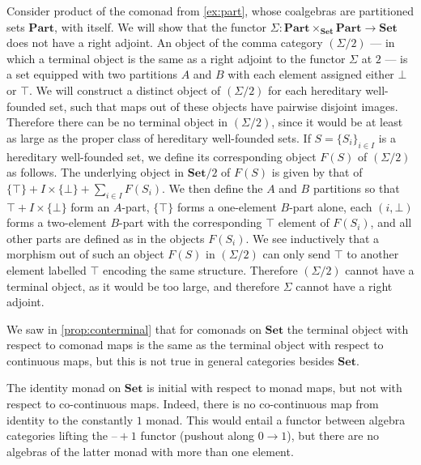 \documentclass[11pt, oneside, article]{memoir}
\theoremstyle{plain}
\theoremstyle{definition}
\theoremstyle{remark}
\newenvironment{counterexample}
{\renewcommand\qedsymbol{$\lrcorner$}%
  \pushQED{\qed}\mycounterexample}
{\popQED\endmycounterexample}
\newcommand{\dash}{{\mathord{\text{--}}}}
\newcommand{\namedcat}[1]{\mathbf{#1}}
\newcommand{\Set}{\namedcat{Set}}
\newcommand{\Part}{\namedcat{Part}}
\newcommand{\carr}{\Sigma}
\newcommand{\setof}[1]{\{#1\}}
\begin{document}
\begin{counterexample}[Non-limit of comonads]\label{ex:nolimit}
  Consider product of the comonad from \cref{ex:part}, whose
  coalgebras are partitioned sets $\Part$, with itself. We will show
  that the functor $\carr \colon \Part \times_\Set \Part \to \Set$
  does not have a right adjoint. An object of the comma category
  $(\carr / 2)$ --- in which a terminal object is the same as a right
  adjoint to the functor $\carr$ at $2$ --- is a set equipped with two
  partitions $A$ and $B$ with each element assigned either $\bot$ or
  $\top$. We will construct a distinct object of $(\carr / 2)$ for
  each hereditary well-founded set, such that maps out of these
  objects have pairwise disjoint images. Therefore there can be no
  terminal object in $(\carr / 2)$, since it would be at least as
  large as the proper class of hereditary well-founded sets. If
  $S = \setof{S_i}_{i \in I}$ is a hereditary well-founded set, we
  define its corresponding object $F(S)$ of $(\carr / 2)$ as
  follows. The underlying object in $\Set/2$ of $F(S)$ is given by
  that of
  $\setof{\top} + I \times \setof{\bot} + \sum_{i \in I} F(S_i)$. We
  then define the $A$ and $B$ partitions so that
  ${\top} + I \times \setof{\bot}$ form an $A$-part, $\setof{\top}$
  forms a one-element $B$-part alone, each $(i, \bot)$ forms a
  two-element $B$-part with the corresponding $\top$ element of
  $F(S_i)$, and all other parts are defined as in the objects
  $F(S_i)$. We see inductively that a morphism out of such an object
  $F(S)$ in $(\carr / 2)$ can only send $\top$ to another element
  labelled $\top$ encoding the same structure. Therefore $(\carr / 2)$
  cannot have a terminal object, as it would be too large, and
  therefore $\carr$ cannot have a right adjoint.
\end{counterexample}


We saw in \cref{prop:conterminal} that for comonads on $\Set$ the
terminal object with respect to comonad maps is the same as the
terminal object with respect to continuous maps, but this is not true
in general categories besides $\Set$.

\begin{counterexample}[Non-initial initial monad]
  The identity monad on $\Set$ is initial with respect to monad maps,
  but not with respect to co-continuous maps. Indeed, there is no
  co-continuous map from identity to the constantly $1$ monad. This
  would entail a functor between algebra categories lifting the
  $\dash + 1$ functor (pushout along $0 \to 1$), but there are no
  algebras of the latter monad with more than one element.
\end{counterexample}
\end{document}

